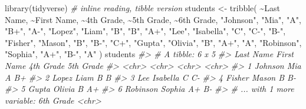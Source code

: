 \documentclass[
]{book}
\newenvironment{Shaded}{\begin{snugshade}}{\end{snugshade}}
\newcommand{\CommentTok}[1]{\textcolor[rgb]{0.56,0.35,0.01}{\textit{#1}}}
\newcommand{\FunctionTok}[1]{\textcolor[rgb]{0.00,0.00,0.00}{#1}}
\newcommand{\NormalTok}[1]{#1}
\newcommand{\OtherTok}[1]{\textcolor[rgb]{0.56,0.35,0.01}{#1}}
\newcommand{\SpecialCharTok}[1]{\textcolor[rgb]{0.00,0.00,0.00}{#1}}
\newcommand{\StringTok}[1]{\textcolor[rgb]{0.31,0.60,0.02}{#1}}
\begin{document}
\begin{Shaded}
\begin{Highlighting}[]
\FunctionTok{library}\NormalTok{(tidyverse)}
\CommentTok{\# inline reading, tibble version}
\NormalTok{students }\OtherTok{\textless{}{-}} \FunctionTok{tribble}\NormalTok{(}
  \SpecialCharTok{\textasciitilde{}}\StringTok{\textquotesingle{}Last Name\textquotesingle{}}\NormalTok{, }\SpecialCharTok{\textasciitilde{}}\StringTok{\textquotesingle{}First Name\textquotesingle{}}\NormalTok{, }\SpecialCharTok{\textasciitilde{}}\StringTok{\textquotesingle{}4th Grade\textquotesingle{}}\NormalTok{, }\SpecialCharTok{\textasciitilde{}}\StringTok{\textquotesingle{}5th Grade\textquotesingle{}}\NormalTok{, }\SpecialCharTok{\textasciitilde{}}\StringTok{\textquotesingle{}6th Grade\textquotesingle{}}\NormalTok{,}
  \StringTok{"Johnson"}\NormalTok{, }\StringTok{"Mia"}\NormalTok{, }\StringTok{"A"}\NormalTok{, }\StringTok{"B+"}\NormalTok{, }\StringTok{"A{-}"}\NormalTok{,}
  \StringTok{"Lopez"}\NormalTok{, }\StringTok{"Liam"}\NormalTok{, }\StringTok{"B"}\NormalTok{, }\StringTok{"B"}\NormalTok{, }\StringTok{"A+"}\NormalTok{,}
  \StringTok{"Lee"}\NormalTok{, }\StringTok{"Isabella"}\NormalTok{, }\StringTok{"C"}\NormalTok{, }\StringTok{"C{-}"}\NormalTok{, }\StringTok{"B{-}"}\NormalTok{,}
  \StringTok{"Fisher"}\NormalTok{, }\StringTok{"Mason"}\NormalTok{, }\StringTok{"B"}\NormalTok{, }\StringTok{"B{-}"}\NormalTok{, }\StringTok{"C+"}\NormalTok{,}
  \StringTok{"Gupta"}\NormalTok{, }\StringTok{"Olivia"}\NormalTok{, }\StringTok{"B"}\NormalTok{, }\StringTok{"A+"}\NormalTok{, }\StringTok{"A"}\NormalTok{,}
  \StringTok{"Robinson"}\NormalTok{, }\StringTok{"Sophia"}\NormalTok{, }\StringTok{"A+"}\NormalTok{, }\StringTok{"B{-}"}\NormalTok{, }\StringTok{"A"}
\NormalTok{)}
\NormalTok{students}
\CommentTok{\#\textgreater{} \# A tibble: 6 x 5}
\CommentTok{\#\textgreater{}   \textasciigrave{}Last Name\textasciigrave{} \textasciigrave{}First Name\textasciigrave{} \textasciigrave{}4th Grade\textasciigrave{} \textasciigrave{}5th Grade\textasciigrave{}}
\CommentTok{\#\textgreater{}   \textless{}chr\textgreater{}       \textless{}chr\textgreater{}        \textless{}chr\textgreater{}       \textless{}chr\textgreater{}      }
\CommentTok{\#\textgreater{} 1 Johnson     Mia          A           B+         }
\CommentTok{\#\textgreater{} 2 Lopez       Liam         B           B          }
\CommentTok{\#\textgreater{} 3 Lee         Isabella     C           C{-}         }
\CommentTok{\#\textgreater{} 4 Fisher      Mason        B           B{-}         }
\CommentTok{\#\textgreater{} 5 Gupta       Olivia       B           A+         }
\CommentTok{\#\textgreater{} 6 Robinson    Sophia       A+          B{-}         }
\CommentTok{\#\textgreater{} \# ... with 1 more variable: 6th Grade \textless{}chr\textgreater{}}
\end{Highlighting}
\end{Shaded}
\end{document}
